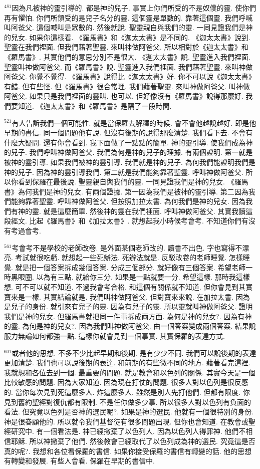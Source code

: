 \documentclass{book}
\begin{document}
$^{481}$因為凡被神的靈引導的.
都是神的兒子.
事實上你們所受的不是奴僕的靈.
使你們再有懼怕.
你們所領受的是兒子名分的靈.
這個靈是單數的.
靠著這個靈.
我們呼喊叫阿爸父.
這個喊叫是眾數的.
然後就說.
聖靈親自與我們的靈.
一同見證我們是神的兒女.
如果你這樣看.
《羅馬書》和《迦太太書》是不同的.
《迦太太書》說到.
聖靈在我們裡面.
但我們藉著聖靈.
來叫神做阿爸父.
所以相對於《迦太太書》和《羅馬書》.
其實他們的意思分別不是很大.
《迦太太書》說.
聖靈進入我們裡面.
聖靈叫神做阿爸父.
而《羅馬書》說.
聖靈進入我們裡面.
我們藉著聖靈.
來叫神做阿爸父.
你覺不覺得.
《羅馬書》說得比《迦太太書》好.
你不可以說《迦太太書》有錯.
但有些怪.
但《羅馬書》很合常理.
我們藉著聖靈.
來叫神做阿爸父.
叫神做阿爸父.
如果只是我們裡面的靈叫.
也可以.
但好像沒有《羅馬書》說得那麼好.
我們要知道.
《迦太太書》和《羅馬書》是隔了一段時間.

$^{521}$有人告訴我們一個可能性.
就是當保羅去解釋的時候.
會不會他越說越好.
即是他早期的書信.
同一個問題他有說.
但沒有後期的說得那麼清楚.
我們看下去.
不會有什麼大疑問.
還有你會看到.
我下面做了一點點的簡單.
神的靈引導.
使我們成為神的兒子.
我們呼叫神做阿爸父.
我們為何是神的兒子的理據.
有兩個證明.
第一就是被神的靈引導.
如果我們被神的靈引導.
我們就是神的兒子.
為何我們能證明我們是神的兒子.
因為神的靈引導我們.
第二就是我們能夠靠著聖靈.
呼叫神做阿爸父.
所以你看到保羅在最後說.
聖靈親自與我們的靈.
一同見證我們是神的兒女.
《羅馬書》為何我們是神的兒女.
有兩個證據.
第一因為我們是被神的靈引導.
第二因為我們能夠靠著聖靈.
呼叫神做阿爸父.
但按照加拉太書.
為何我們是神的兒女.
因為我們有神的靈.
就是這麼簡單.
然後神的靈在我們裡面.
呼叫神做阿爸父.
其實我讀這段經文.
比起《羅馬書》和《加拉太書》.
就想起我小時候考會考.
不知道你們有沒有考過會考.

$^{561}$考會考不是學校的老師改卷.
是外面某個老師改的.
讀書不出色.
字也寫得不漂亮.
考試就很吃虧.
就想起一些死辦法.
死辦法就是.
反駁改卷的老師睡覺.
怎樣睡覺.
就是把一個答案拆成幾個答案.
分成三個部分.
就好像有三個答案.
希望老師一時黑眼圈.
以為有三點.
就給你三分.
如果是一點就要一分.
希望這樣.
那時我這樣想.
可不可以就不知道.
不過我會考合格.
和這個有關係就不知道.
但你會見到其實寶來是一樣.
其實結論就是.
我們叫神做阿爸父.
但對寶來來說.
在加拉太書.
因為是兒子的身份.
就引來有兒子的靈.
因為有兒子的靈.
所以靈就叫神做阿爸父.
證明我們是神的兒女.
但羅馬書就把同一件事拆成兩方面.
為何是神的兒女?.
因為有神的靈.
為何是神的兒女?.
因為我們叫神做阿爸父.
由一個答案變成兩個答案.
結果說服力無論如何都強一點.
這樣你就會見到一個事實.
其實保羅的表達方式.

$^{601}$或者他的思想.
不多不少比起早期和後期.
是有少少不同.
我們可以說後期的表達更加清楚.
我們也可以說後期的表達.
和前期的有些微不同的地方.
藉著看完這裡.
我就想和各位去到一個.
最重要的問題.
就是教會和以色列的關係.
其實今天是一個比較敏感的問題.
因為大家知道.
因為現在打仗的問題.
很多人對以色列是很反感的.
當你每次見到死這麼多人.
炸這麼多人.
雖然是別人先打他們.
但都有限度.
你見到舊約聖經對復仇都有限制.
不是任你做多少事.
所以很多人對以色列有負面的看法.
但究竟以色列是否神的選民呢?.
如果是神的選民.
他就有一個很特別的身份.
神是很眷顧他的.
所以就令我們基督徒有很多問題出現.
但你也會知道.
在教會或聖經研究中.
有一個看法是.
神已經撇棄了以色列人.
因為以色列人得罪神.
他們不相信耶穌.
所以神撇棄了他們.
然後教會已經取代了以色列成為神的選民.
究竟這是否真的呢?.
我想和各位看保羅的書信.
如果你接受保羅的書信有轉變的話.
他的思想有轉變和發展.
有些人會看.
保羅在早期的書信中.
\end{document}
